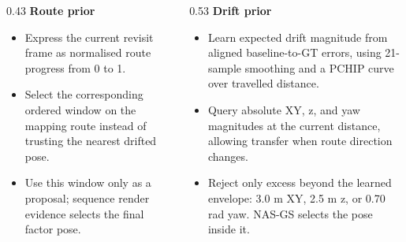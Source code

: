 \documentclass[
	aspectratio=169,
	t,
	onlytextwidth,
	10pt,
]{beamer}
\begin{document}
\begin{frame}
	\vspace{0.5mm}
	\begin{columns}[T]
		\begin{column}{0.43\textwidth}
			{\small\textbf{Route prior}}
			{\scriptsize
			\begin{itemize}
				\setlength{\itemsep}{1.2mm}
				\item Express the current revisit frame as normalised route progress from 0 to 1.
				\item Select the corresponding ordered window on the mapping route instead of trusting the nearest drifted pose.
				\item Use this window only as a proposal; sequence render evidence selects the final factor pose.
			\end{itemize}
			}
		\end{column}
		\begin{column}{0.53\textwidth}
			{\small\textbf{Drift prior}}
			{\scriptsize
			\begin{itemize}
				\setlength{\itemsep}{1.0mm}
				\item Learn expected drift magnitude from aligned baseline-to-GT errors, using 21-sample smoothing and a PCHIP curve over travelled distance.
				\item Query absolute XY, z, and yaw magnitudes at the current distance, allowing transfer when route direction changes.
				\item Reject only excess beyond the learned envelope: 3.0 m XY, 2.5 m z, or 0.70 rad yaw. NAS-GS selects the pose inside it.
			\end{itemize}
			}
		\end{column}
	\end{columns}
\end{frame}



\end{document}
